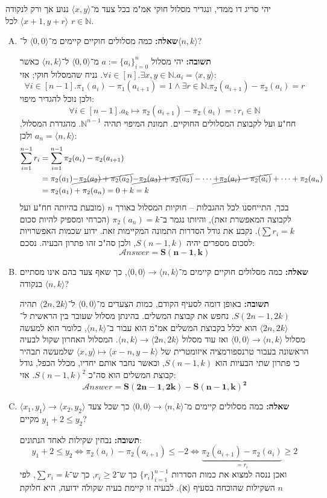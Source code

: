 \documentclass[]{article}
\newcommand\N     {\mathbb{N}}
\newcommand\ans   {\mathscr{A}\!\mathit{nswer}}
\newcommand\ra    {\rangle}
\newcommand\la    {\langle}
\begin{document}
	\section{}
	יהי סריג דו ממדי, ונגדיר מסלול חוקי אמ"מ בכל צעד מ־$\la x, y \ra$ ננוע אך ורק לנקודה $\la x + 1, y + r \ra$ לכל $r \in \N$. 
	\begin{enumerate}[(A)]
		\item \textbf{שאלה: }כמה מסלולים חוקיים קיימים מ־$\la 0, 0 \ra$ ל־$\la n, k\ra$? 
		
		\textbf{תשובה: }יהי מסלול $a := \{a_i\}_{i = 0}^n$ מ־$\la 0, 0 \ra$ ל־$\la n, k \ra$ כאשר $\forall i \in [n]. \exists x, y \in \N. a_i = \la x, y \ra$. נניח שהמסלול חוקי; אזי: 
		\[\forall i \in [n - 1]. \pi_1(a_i) - \pi_1(a_{i + 1}) = 1 \land \exists r \in \N. \pi_2(a_{i + 1}) - \pi_2(a_{i}) = r\]
		ולכן נוכל להגדיר מיפוי: 
		\[ \forall i \in [n - 1]. a_k \mapsto \pi_2(a_{i + 1}) - \pi_2(a_{i}) =: r_i \in \N \]
		חח"ע ועל לקבוצת המסלולים החוקיים. תמונת המיפוי תהיה $\N^{n - 1}$. מהגדרת המסלול, $a_n = \la n, k \ra$ ולכן: 
		\begin{align*}
			\sum_{i = 1}^{n - 1}r_i &= \sum_{i = 1}^{n - 1}\pi_2(a_i) - \pi_2(a_{i + 1}) \\ 
			&= \pi_2(a_1) \cancel{- \pi_2(a_2) + \pi_2(a_2)} \cancel{- \pi_2(a_3) + \pi_2(a_3)} - \cdots \cancel{+ \pi_2(a_i) - \pi_2(a_i)} + \dots + \pi_2(a_n) \\
			&= \pi_2(a_1) + \pi_2(a_n) = 0 + k = k
		\end{align*}
		בכך, התייחסנו לכל ההגבלות – חוקיות המסלול באורך $n$ (מובעת בהיותה חח"ע ועל לקבוצה המאפשרת זאת), והיותו נגמר ב־$\pi_2(a_n) = k$ (הכרחי ומספיק להיות סכום $\sum r_i = k$). נקבע את גודל הסדרות התמונה המקיימות זאת. ידוע שכמות האפשרויות לסכום מספרים יהיה $S(n - 1, k)$, ולכן סה"כ זהו פתרון הבעיה. נסכם: 
		\[ \ans = \bm{S(n - 1, k)} \]
		\item \textbf{שאלה: }כמה מסלולים חוקיים קיימים מ־$\la 0, 0 \ra \to \la n, k \ra$, כך שאף צעד בהם אינו מסתיים בנקודה $\la n, k \ra$?
		
		\textbf{תשובה: }באופן דומה לסעיף הקודם, כמות הצעדים מ־$\la 0, 0 \ra$ ל־$\la 2n, 2k\ra$ תהיה $S(2n - 1, 2k)$. נחפש את קבוצת המשלים. בהינתן מסלול שעובר בין הראשית ל־$\la 2n, 2k\ra$ הוא יכלל בקבוצת המשלים אמ"מ הוא עבור ב־$\la n, k \ra$, כלומר הוא למעשה מסלול $\la 0, 0 \ra \to \la n, k\ra$ ואז עוד מסלול $\la n, k\ra \to \la 2n, 2k \ra$. המסלול האחרון שקול לבעיה הראשונה בעבור טרנספורמציה איזומטרית של $\la x, y \ra \mapsto \la x - n, y - k\ra$ שלמעשה תבהיר כי פתרון שתי הבעיות הוא $S(n - 1, k)$, וכאשר נחבר אותם יחדיו, מכלל הכפל, גודל קבוצת המשלים הוא סה"כ $S(n - 1, k)^2$. אזי: 
		\[ \ans = \bm{S(2n - 1, 2k) - S(n - 1, k)^2} \]
		\item \textbf{שאלה: }כמה מסלולים קיימים מ־$\la 0, 0 \ra \to \la n, k \ra$ כך שכל צעד $\la x_1, y_1 \ra \to \la x_2, y_2 \ra$ מקיים $y_1 + 2 \le y_2$?
		
		\textbf{תשובה: }נבחין שקילות לאחד הנתונים: 
		\[ y_1 + 2 \le y_2 \iff \pi_2(a_i) - \pi_2(a_{i + 1}) \le -2 \iff \underbrace{\pi_2(a_{i + 1}) - \pi_2(a_i)}_{=r_i} \ge 2 \]
		ואכן ננסה למצוא את כמות הסדרות $\{r_i\}_{i = 1}^{n - 1}$ כך ש־$r_i \ge 2$, כך ש־$\sum r_i = k$, לפי השקילות שהוכחה בסעיף (א). לבעיה זו קיימת בעיה שקולה ידועה, היא חלוקת $n$
	\end{enumerate}
\end{document}

